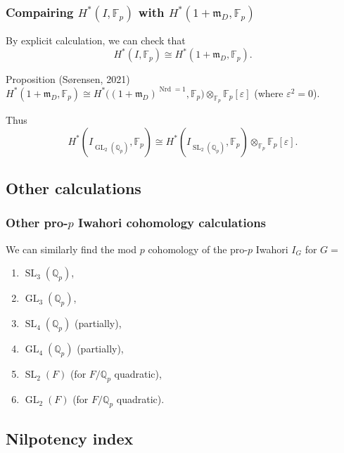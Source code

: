 \documentclass{beamer}
\newcommand*\Q{\mathbb{Q}}
\newcommand*\F{\mathbb{F}}
\DeclareMathOperator{\GL}{GL} %
\DeclareMathOperator{\SL}{SL} %
\DeclareMathOperator{\Nrd}{Nrd}
\newcommand*\iso{\cong} %
\newcommand*\idm{\mathfrak{m}}
\begin{document}
\begin{frame}
  \frametitle{Compairing $H^{*}(I,\F_{p})$ with $H^{*}(1+\idm_{D},\F_{p})$}

  By explicit calculation, we can check that
  \[
    H^{*}(I,\F_{p}) \iso H^{*}(1+\idm_{D},\F_{p}).
  \]

  \begin{block}{Proposition (Sørensen, 2021)}
    $H^{*}(1+\idm_{D},\F_{p}) \iso H^{*}\bigl( (1+\idm_{D})^{\Nrd = 1},\F_{p} \bigr) \otimes_{\F_{p}} \F_{p}[\varepsilon]$ (where $\varepsilon^{2}=0$).
  \end{block}

  Thus
  \[
    H^{*}(I_{\GL_{2}(\Q_{p})},\F_{p}) \iso H^{*}(I_{\SL_{2}(\Q_{p})},\F_{p}) \otimes_{\F_{p}} \F_{p}[\varepsilon].
  \]
\end{frame}

\subsection{Other calculations}

\begin{frame}
  \frametitle{Other pro-$p$ Iwahori cohomology calculations}

  We can similarly find the mod $p$ cohomology of the pro-$p$ Iwahori $I_{G}$ for $G = {}$
  \begin{enumerate}[$\bullet$]
    \item $\SL_{3}(\Q_{p})$,
    \item $\GL_{3}(\Q_{p})$,
    \item $\SL_{4}(\Q_{p})$ (partially),
    \item $\GL_{4}(\Q_{p})$ (partially),
    \item $\SL_{2}(F)$ (for $F/\Q_{p}$ quadratic),
    \item $\GL_{2}(F)$ (for $F/\Q_{p}$ quadratic).
  \end{enumerate}
\end{frame}

\subsection{Nilpotency index}
\end{document}
